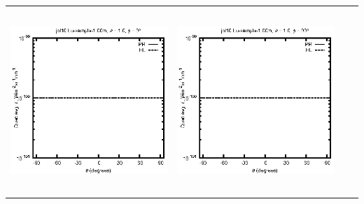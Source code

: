 \begin{tabular}{c c c c}
\includegraphics[height=7cm]{../eps/jol10_Lu_sample_1.00m_fwd.eps} &
\includegraphics[height=7cm]{../eps/jol10_Lu_sample_1.00m_cross.eps} \\
\end{tabular}

\pagebreak

